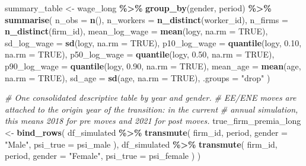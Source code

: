 \documentclass[
]{article}
\newenvironment{Shaded}{\begin{snugshade}}{\end{snugshade}}
\newcommand{\AttributeTok}[1]{\textcolor[rgb]{0.13,0.29,0.53}{#1}}
\newcommand{\CommentTok}[1]{\textcolor[rgb]{0.56,0.35,0.01}{\textit{#1}}}
\newcommand{\ConstantTok}[1]{\textcolor[rgb]{0.56,0.35,0.01}{#1}}
\newcommand{\FloatTok}[1]{\textcolor[rgb]{0.00,0.00,0.81}{#1}}
\newcommand{\FunctionTok}[1]{\textcolor[rgb]{0.13,0.29,0.53}{\textbf{#1}}}
\newcommand{\NormalTok}[1]{#1}
\newcommand{\OtherTok}[1]{\textcolor[rgb]{0.56,0.35,0.01}{#1}}
\newcommand{\SpecialCharTok}[1]{\textcolor[rgb]{0.81,0.36,0.00}{\textbf{#1}}}
\newcommand{\StringTok}[1]{\textcolor[rgb]{0.31,0.60,0.02}{#1}}
\begin{document}
\begin{Shaded}
\begin{Highlighting}[]
\NormalTok{summary\_table }\OtherTok{\textless{}{-}}\NormalTok{ wage\_long }\SpecialCharTok{\%\textgreater{}\%}
    \FunctionTok{group\_by}\NormalTok{(gender, period) }\SpecialCharTok{\%\textgreater{}\%}
    \FunctionTok{summarise}\NormalTok{(}
        \AttributeTok{n\_obs =} \FunctionTok{n}\NormalTok{(),}
        \AttributeTok{n\_workers =} \FunctionTok{n\_distinct}\NormalTok{(worker\_id),}
        \AttributeTok{n\_firms =} \FunctionTok{n\_distinct}\NormalTok{(firm\_id),}
        \AttributeTok{mean\_log\_wage =} \FunctionTok{mean}\NormalTok{(logy, }\AttributeTok{na.rm =} \ConstantTok{TRUE}\NormalTok{),}
        \AttributeTok{sd\_log\_wage =} \FunctionTok{sd}\NormalTok{(logy, }\AttributeTok{na.rm =} \ConstantTok{TRUE}\NormalTok{),}
        \AttributeTok{p10\_log\_wage =} \FunctionTok{quantile}\NormalTok{(logy, }\FloatTok{0.10}\NormalTok{, }\AttributeTok{na.rm =} \ConstantTok{TRUE}\NormalTok{),}
        \AttributeTok{p50\_log\_wage =} \FunctionTok{quantile}\NormalTok{(logy, }\FloatTok{0.50}\NormalTok{, }\AttributeTok{na.rm =} \ConstantTok{TRUE}\NormalTok{),}
        \AttributeTok{p90\_log\_wage =} \FunctionTok{quantile}\NormalTok{(logy, }\FloatTok{0.90}\NormalTok{, }\AttributeTok{na.rm =} \ConstantTok{TRUE}\NormalTok{),}
        \AttributeTok{mean\_age =} \FunctionTok{mean}\NormalTok{(age, }\AttributeTok{na.rm =} \ConstantTok{TRUE}\NormalTok{),}
        \AttributeTok{sd\_age =} \FunctionTok{sd}\NormalTok{(age, }\AttributeTok{na.rm =} \ConstantTok{TRUE}\NormalTok{),}
        \AttributeTok{.groups =} \StringTok{"drop"}
\NormalTok{    )}

\CommentTok{\# One consolidated descriptive table by year and gender.}
\CommentTok{\# EE/ENE moves are attached to the origin year of the transition: in the current}
\CommentTok{\# annual simulation, this means 2018 for pre moves and 2021 for post moves.}
\NormalTok{true\_firm\_premia\_long }\OtherTok{\textless{}{-}} \FunctionTok{bind\_rows}\NormalTok{(}
\NormalTok{    df\_simulated }\SpecialCharTok{\%\textgreater{}\%}
        \FunctionTok{transmute}\NormalTok{(}
\NormalTok{            firm\_id,}
\NormalTok{            period,}
            \AttributeTok{gender =} \StringTok{"Male"}\NormalTok{,}
            \AttributeTok{psi\_true =}\NormalTok{ psi\_male}
\NormalTok{        ),}
\NormalTok{    df\_simulated }\SpecialCharTok{\%\textgreater{}\%}
        \FunctionTok{transmute}\NormalTok{(}
\NormalTok{            firm\_id,}
\NormalTok{            period,}
            \AttributeTok{gender =} \StringTok{"Female"}\NormalTok{,}
            \AttributeTok{psi\_true =}\NormalTok{ psi\_female}
\NormalTok{        )}
\NormalTok{)}


\end{Highlighting}
\end{Shaded}
\end{document}
